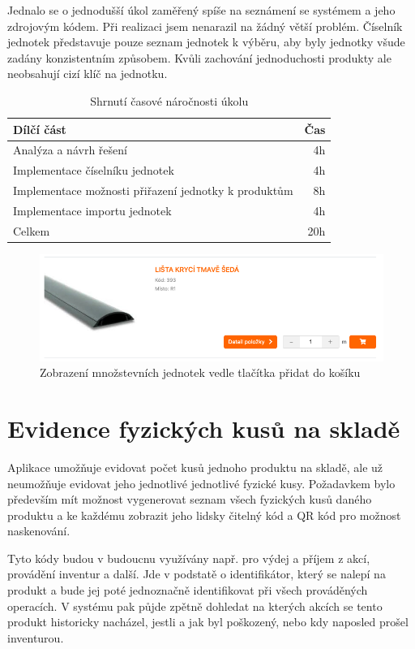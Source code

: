 Jednalo se o jednodušší úkol zaměřený spíše na seznámení se systémem a jeho zdrojovým kódem. Při realizaci jsem nenarazil na žádný větší problém. Číselník jednotek představuje pouze seznam jednotek k výběru, aby byly jednotky všude zadány konzistentním způsobem. Kvůli zachování jednoduchosti produkty ale neobsahují cizí klíč na jednotku.

\begin{table}
	\centering
	\caption[Časová náročnost úkolu na zavedení množstevních jednotek]{Shrnutí časové náročnosti úkolu}
	\label{tab:TopLevelTableLabel}
		\begin{tabular}{lr}
			\toprule
			Dílčí část & Čas\\
			\midrule
			Analýza a návrh řešení & 4h \\
			Implementace číselníku jednotek & 4h \\
			Implementace možnosti přiřazení jednotky k produktům & 8h \\
			Implementace importu jednotek & 4h \\
            \midrule
            Celkem  & 20h \\
			\midrule
		\end{tabular}
\end{table}

\begin{figure}
    \centering
    \includegraphics[width=0.7\linewidth]{Figures/mnozstevni-jednotky.png}
    \caption{Zobrazení množstevních jednotek vedle tlačítka přidat do košíku}
    \label{fig:enter-label}
\end{figure}

\section{Evidence fyzických kusů na skladě}

Aplikace umožňuje evidovat počet kusů jednoho produktu na skladě, ale už neumožňuje evidovat jeho jednotlivé jednotlivé fyzické kusy. Požadavkem bylo především mít možnost vygenerovat seznam všech fyzických kusů daného produktu a ke každému zobrazit jeho lidsky čitelný kód a QR kód pro možnost naskenování.

Tyto kódy budou v budoucnu využívány např. pro výdej a příjem z akcí, provádění inventur a další. Jde v podstatě o identifikátor, který se nalepí na produkt a bude jej poté jednoznačně identifikovat při všech prováděných operacích. V systému pak půjde zpětně dohledat na kterých akcích se tento produkt historicky nacházel, jestli a jak byl poškozený, nebo kdy naposled prošel inventurou.

